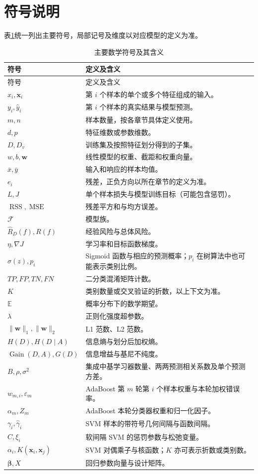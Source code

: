 \section*{符号说明}\label{app:notation}
表\ref{tab:notation}统一列出主要符号，局部记号及维度以对应模型的定义为准。
\begin{longtable}{p{39mm}p{105mm}}
\caption{主要数学符号及其含义}\label{tab:notation}\\
\toprule
符号&定义及含义\\\midrule\endfirsthead
\toprule
符号&定义及含义\\\midrule\endhead
$x_i,\boldsymbol{x}_i$&第 $i$ 个样本的单个或多个特征组成的输入。\\
$y_i,\hat y_i$&第 $i$ 个样本的真实结果与模型预测。\\
$m,n$&样本数量，按各章节具体定义使用。\\
$d,p$&特征维数或参数维数。\\
$D,D_v$&训练集及按照特征划分得到的子集。\\
$w,b,\boldsymbol w$&线性模型的权重、截距和权重向量。\\
$\bar x,\bar y$&输入和响应的样本均值。\\
$e_i$&残差，正负方向以所在章节的定义为准。\\
$L,J$&单个样本损失与模型训练目标（可能包含惩罚）。\\
$\operatorname{RSS},\operatorname{MSE}$&残差平方和与均方误差。\\
$\mathcal F$&模型族。\\
$\widehat R_D(f),R(f)$&经验风险与总体风险。\\
$\eta,\nabla J$&学习率和目标函数梯度。\\
$\sigma(z),p_i$&Sigmoid 函数与相应的预测概率；$p_i$ 在树算法中也可能表示类别比例。\\
$TP,FP,TN,FN$&二分类混淆矩阵计数。\\
$K$&类别数量或交叉验证的折数，以上下文为准。\\
$\mathbb E$&概率分布下的数学期望。\\
$\lambda$&正则化强度超参数。\\
$\|\boldsymbol w\|_1,\|\boldsymbol w\|_2$&L1 范数、L2 范数。\\
$H(D),H(D\mid A)$&信息熵与划分后加权熵。\\
$\operatorname{Gain}(D,A),G(D)$&信息增益与基尼不纯度。\\
$B,\rho,\sigma^2$&集成中基学习器数量、两两预测相关系数及单个预测方差。\\
$w_{m,i},\varepsilon_m$&AdaBoost 第 $m$ 轮第 $i$ 个样本权重与本轮加权错误率。\\
$\alpha_m,Z_m$&AdaBoost 本轮分类器权重和归一化因子。\\
$\gamma_i,\hat\gamma_i$&SVM 样本的带符号几何间隔与函数间隔。\\
$C,\xi_i$&软间隔 SVM 的惩罚参数与松弛变量。\\
$\alpha_i,K(\boldsymbol x_i,\boldsymbol x_j)$&SVM 对偶乘子与核函数；$K$ 亦可表示折数或类别数。\\
$\boldsymbol\beta,X$&回归参数向量与设计矩阵。\\
\bottomrule
\end{longtable}
